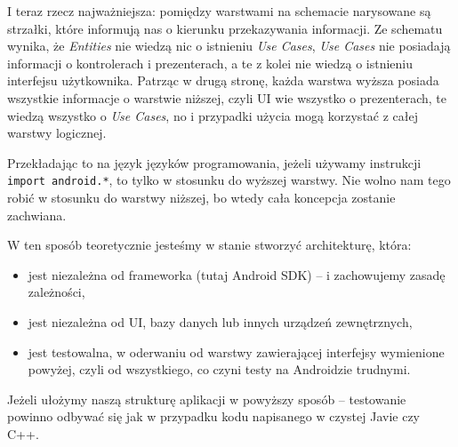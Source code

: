 I teraz rzecz najważniejsza: pomiędzy warstwami na schemacie narysowane są strzałki, które informują nas o kierunku przekazywania informacji. Ze schematu wynika, że \textit{Entities} nie wiedzą nic o istnieniu \textit{Use Cases}, \textit{Use Cases} nie posiadają informacji o kontrolerach i prezenterach, a te z kolei nie wiedzą o istnieniu interfejsu użytkownika. Patrząc w drugą stronę, każda warstwa wyższa posiada wszystkie informacje o warstwie niższej, czyli UI wie wszystko o prezenterach, te wiedzą wszystko o \textit{Use Cases}, no i przypadki użycia mogą korzystać z całej warstwy logicznej.

Przekładając to na język języków programowania, jeżeli używamy instrukcji \texttt{import android.*}, to tylko w stosunku do wyższej warstwy. Nie wolno nam tego robić w stosunku do warstwy niższej, bo wtedy cała koncepcja zostanie zachwiana.

W ten sposób teoretycznie jesteśmy w stanie stworzyć architekturę, która:
\begin{itemize}
\item
jest niezależna od frameworka (tutaj Android SDK) – i zachowujemy zasadę zależności,
\item
jest niezależna od UI, bazy danych lub innych urządzeń zewnętrznych,
\item
jest testowalna, w oderwaniu od warstwy zawierającej interfejsy wymienione powyżej, czyli od wszystkiego, co czyni testy na Androidzie trudnymi.
\end{itemize}

Jeżeli ułożymy naszą strukturę aplikacji w powyższy sposób – testowanie powinno odbywać się jak w przypadku kodu napisanego w czystej Javie czy C++.
